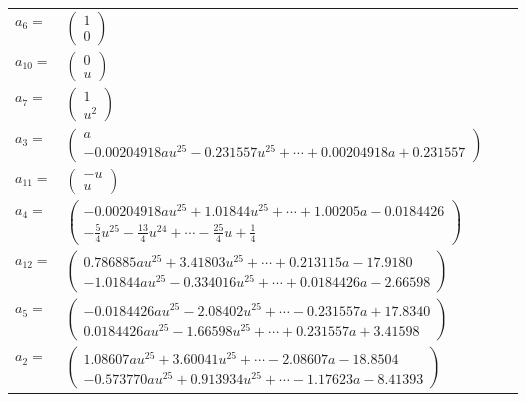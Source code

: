 \documentclass[1p]{elsarticle_modified}
\theoremstyle{definition}
\begin{document}
\begin{tabular}{m{7pt} m{180pt} m{7pt} m{180pt} }
\flushright $a_{6}=$&$\begin{pmatrix}1\\0\end{pmatrix}$ \\
\flushright $a_{10}=$&$\begin{pmatrix}0\\u\end{pmatrix}$ \\
\flushright $a_{7}=$&$\begin{pmatrix}1\\u^2\end{pmatrix}$ \\
\flushright $a_{3}=$&$\begin{pmatrix}a\\-0.00204918 a u^{25}-0.231557 u^{25}+\cdots+0.00204918 a+0.231557\end{pmatrix}$ \\
\flushright $a_{11}=$&$\begin{pmatrix}- u\\u\end{pmatrix}$ \\
\flushright $a_{4}=$&$\begin{pmatrix}-0.00204918 a u^{25}+1.01844 u^{25}+\cdots+1.00205 a-0.0184426\\-\frac{5}{4} u^{25}-\frac{13}{4} u^{24}+\cdots-\frac{25}{4} u+\frac{1}{4}\end{pmatrix}$ \\
\flushright $a_{12}=$&$\begin{pmatrix}0.786885 a u^{25}+3.41803 u^{25}+\cdots+0.213115 a-17.9180\\-1.01844 a u^{25}-0.334016 u^{25}+\cdots+0.0184426 a-2.66598\end{pmatrix}$ \\
\flushright $a_{5}=$&$\begin{pmatrix}-0.0184426 a u^{25}-2.08402 u^{25}+\cdots-0.231557 a+17.8340\\0.0184426 a u^{25}-1.66598 u^{25}+\cdots+0.231557 a+3.41598\end{pmatrix}$ \\
\flushright $a_{2}=$&$\begin{pmatrix}1.08607 a u^{25}+3.60041 u^{25}+\cdots-2.08607 a-18.8504\\-0.573770 a u^{25}+0.913934 u^{25}+\cdots-1.17623 a-8.41393\end{pmatrix}$ \\

\end{tabular}
\end{document}
